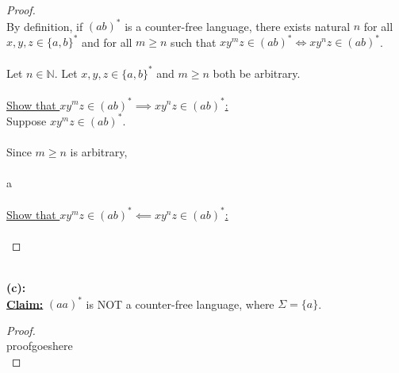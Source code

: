 \documentclass[12pt]{article}
\begin{document}
\begin{proof}
\leavevmode\\
    By definition, if $(ab)^*$ is a counter-free language, there exists natural $n$ for all $x, y, z \in \{ a, b \}^*$ and for all $m \geq n$ such that $xy^mz \in (ab)^* \iff xy^nz \in (ab)^*$. \\
    \\
    Let $n \in \mathbb{N}$. Let $x, y, z \in \{ a, b \}^*$ and $m \geq n$ both be arbitrary. \\
    \\
    \underline{Show that $xy^mz \in (ab)^* \implies xy^nz \in (ab)^*$:} \\
    Suppose $xy^mz \in (ab)^*$. \\
    \\
    Since $m \geq n$ is arbitrary,  \\
    \\
    a \\
    \\
    \underline{Show that $xy^mz \in (ab)^* \impliedby xy^nz \in (ab)^*$:} \\
    \\
\end{proof}
\leavevmode\\
\textbf{(c):} \\
\textbf{\underline{Claim:}} $(aa)^*$ is NOT a counter-free language, where $\Sigma = \{ a \} $. 
\begin{proof}
\leavevmode\\
    proofgoeshere \\
\end{proof}
\pagebreak
\end{document}
